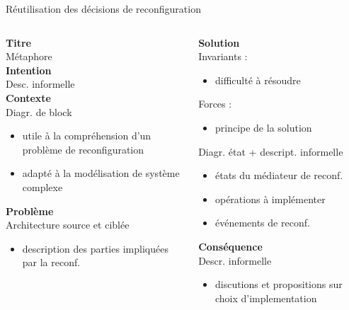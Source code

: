 \begin{frame}{Réutilisation des décisions de reconfiguration}
\begin{columns}
\begin{column}{0.5\textwidth}
\textbf{Titre}\\
Métaphore\\
\vspace{1mm}
\textbf{Intention}\\
Desc. informelle\\
\vspace{1mm}
\textbf{Contexte}\\
Diagr. de block 
\begin{itemize}
\item utile à la compréhension d'un problème de reconfiguration
\item adapté à la modélisation de système complexe
\end{itemize}                                                                   
\textbf{Problème}\\
Architecture source et ciblée 
\begin{itemize}
\item description des parties impliquées par la reconf. 
\end{itemize}
\end{column}
\begin{column}{0.5\textwidth}
\textbf{Solution}\\
Invariants : 
\begin{itemize}
\item difficulté à résoudre
\end{itemize}             
Forces :                                                         
\begin{itemize}
\item principe de la solution
\end{itemize}             
Diagr. état + descript. informelle                                                              
\begin{itemize}
\item états du médiateur de reconf.
\item opérations à implémenter
\item événements de reconf.
\end{itemize}             
\textbf{Conséquence}\\
Descr. informelle
\begin{itemize}
\item discutions et propositions sur choix d'implementation 
\end{itemize}             
\end{column}
\end{columns}
\end{frame}

